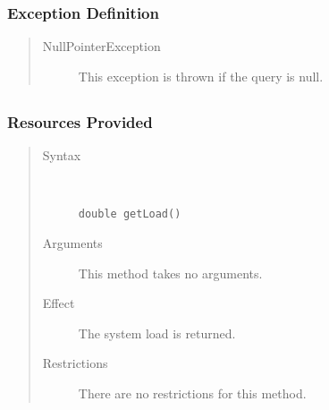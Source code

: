 \subsubsection{Exception Definition}

\begin{quote}
	\begin{description}
		\item[NullPointerException] This exception is thrown if the query is null.
	\end{description} 
\end{quote}

\subsection{}

\subsubsection{Resources Provided}

\begin{quote}
	\begin{description}
		\item[Syntax] \ 
		\begin{verbatim}
double getLoad() 
		\end{verbatim}
		\item[Arguments] This method takes no arguments.
		\item[Effect] The system load is returned. 
		\item[Restrictions] There are no restrictions for this method.
	\end{description} 
\end{quote}